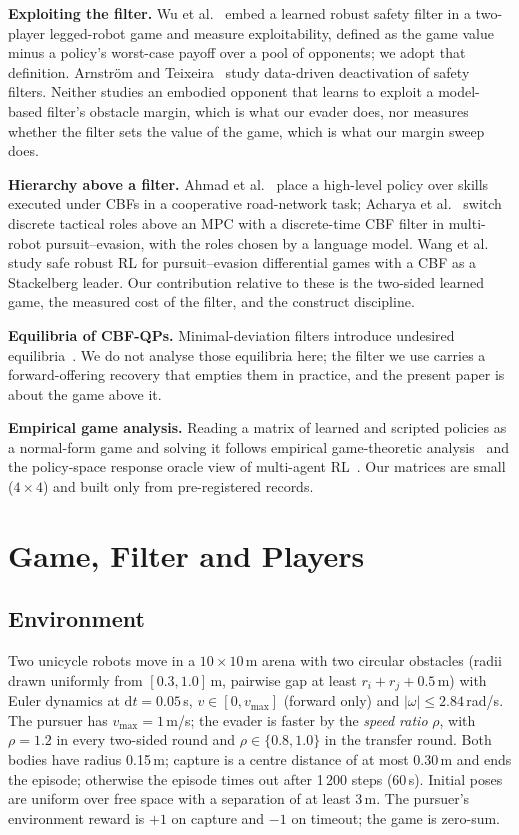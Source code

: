 \documentclass[conference]{IEEEtran}
\newcommand{\dd}{\mathrm{d}}
\begin{document}
\textbf{Exploiting the filter.} Wu et al.~\cite{wu2026competence} embed a learned robust safety filter in a two-player legged-robot game and measure exploitability, defined as the game value minus a policy's worst-case payoff over a pool of opponents; we adopt that definition. Arnstr\"om and Teixeira~\cite{arnstrom2025stealthy} study data-driven deactivation of safety filters. Neither studies an embodied opponent that learns to exploit a model-based filter's obstacle margin, which is what our evader does, nor measures whether the filter sets the value of the game, which is what our margin sweep does.

\textbf{Hierarchy above a filter.} Ahmad et al.~\cite{ahmad2025hmarlcbf} place a high-level policy over skills executed under CBFs in a cooperative road-network task; Acharya et al.~\cite{acharya2026engagement} switch discrete tactical roles above an MPC with a discrete-time CBF filter in multi-robot pursuit--evasion, with the roles chosen by a language model. Wang et al.~\cite{wang2026saferobust} study safe robust RL for pursuit--evasion differential games with a CBF as a Stackelberg leader. Our contribution relative to these is the two-sided learned game, the measured cost of the filter, and the construct discipline.

\textbf{Equilibria of CBF-QPs.} Minimal-deviation filters introduce undesired equilibria~\cite{reis2021cbfqp,tan2024undesired}. We do not analyse those equilibria here; the filter we use carries a forward-offering recovery that empties them in practice, and the present paper is about the game above it.

\textbf{Empirical game analysis.} Reading a matrix of learned and scripted policies as a normal-form game and solving it follows empirical game-theoretic analysis~\cite{wellman2006methods} and the policy-space response oracle view of multi-agent RL~\cite{lanctot2017unified}. Our matrices are small ($4\times4$) and built only from pre-registered records.

\section{Game, Filter and Players}
\label{sec:setup}

\subsection{Environment}
Two unicycle robots move in a $10\times10$\,m arena with two circular obstacles (radii drawn uniformly from $[0.3,1.0]$\,m, pairwise gap at least $r_i+r_j+0.5$\,m) with Euler dynamics at $\dd t=0.05$\,s, $v\in[0,v_{\max}]$ (forward only) and $|\omega|\le 2.84$\,rad/s. The pursuer has $v_{\max}=1$\,m/s; the evader is faster by the \emph{speed ratio} $\rho$, with $\rho=1.2$ in every two-sided round and $\rho\in\{0.8,1.0\}$ in the transfer round. Both bodies have radius 0.15\,m; capture is a centre distance of at most 0.30\,m and ends the episode; otherwise the episode times out after 1\,200 steps (60\,s). Initial poses are uniform over free space with a separation of at least 3\,m. The pursuer's environment reward is $+1$ on capture and $-1$ on timeout; the game is zero-sum.
\end{document}
